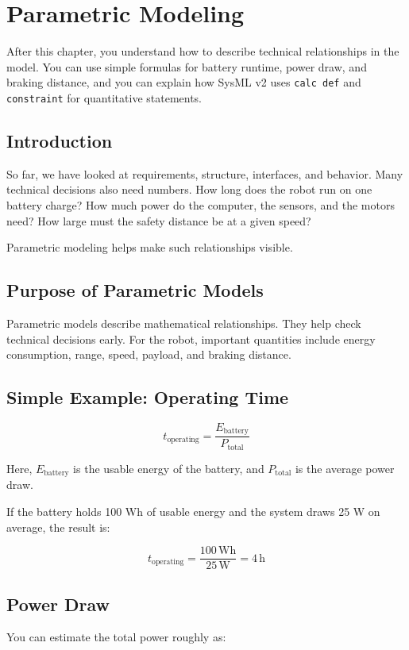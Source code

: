 \chapter{Parametric Modeling}

\begin{lernziele}
After this chapter, you understand how to describe technical relationships in the model. You can use simple formulas for battery runtime, power draw, and braking distance, and you can explain how SysML v2 uses \texttt{calc def} and \texttt{constraint} for quantitative statements.
\end{lernziele}

\section{Introduction}
So far, we have looked at requirements, structure, interfaces, and behavior. Many technical decisions also need numbers. How long does the robot run on one battery charge? How much power do the computer, the sensors, and the motors need? How large must the safety distance be at a given speed?

Parametric modeling helps make such relationships visible.

\section{Purpose of Parametric Models}
Parametric models describe mathematical relationships. They help check technical decisions early. For the robot, important quantities include energy consumption, range, speed, payload, and braking distance.

\section{Simple Example: Operating Time}
\[
t_{\text{operating}} = \frac{E_{\text{battery}}}{P_{\text{total}}}
\]

Here, \(E_{\text{battery}}\) is the usable energy of the battery, and \(P_{\text{total}}\) is the average power draw.

If the battery holds 100 Wh of usable energy and the system draws 25 W on average, the result is:

\[
t_{\text{operating}} = \frac{100\,\text{Wh}}{25\,\text{W}} = 4\,\text{h}
\]

\section{Power Draw}
You can estimate the total power roughly as:

